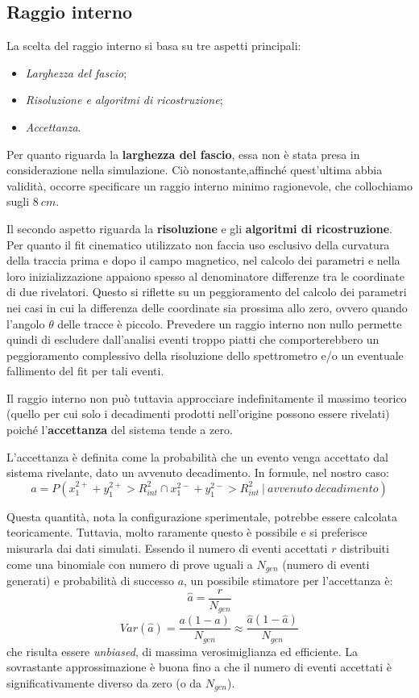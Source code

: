 \documentclass[8pt]{extarticle}
\begin{document}
\subsection{Raggio interno} \label{subsec:raggio_interno}
La scelta del raggio interno si basa su tre aspetti principali:
\begin{itemize}
\item \textit{Larghezza del fascio};
\item \textit{Risoluzione e algoritmi di ricostruzione};
\item \textit{Accettanza}.
\end{itemize}

Per quanto riguarda la \textbf{larghezza del fascio}, essa non è stata presa in considerazione nella simulazione. Ciò nonostante,affinché quest'ultima abbia validità, occorre specificare un raggio interno minimo ragionevole, che collochiamo sugli $8\ cm$. \medskip	

Il secondo aspetto riguarda la \textbf{risoluzione} e gli \textbf{algoritmi di ricostruzione}. Per quanto il fit cinematico utilizzato non faccia uso esclusivo della curvatura della traccia prima e dopo il campo magnetico, nel calcolo dei parametri e nella loro inizializzazione appaiono spesso al denominatore differenze tra le coordinate di due rivelatori. Questo si riflette su un peggioramento del calcolo dei parametri nei casi in cui la differenza delle coordinate sia prossima allo zero, ovvero quando l'angolo $\theta$ delle tracce è piccolo. Prevedere un raggio interno non nullo permette quindi di escludere dall'analisi eventi troppo piatti che comporterebbero un peggioramento complessivo della risoluzione dello spettrometro e/o un eventuale fallimento del fit per tali eventi. \medskip

Il raggio interno non può tuttavia approcciare indefinitamente il massimo teorico (quello per cui solo i decadimenti prodotti nell'origine possono essere rivelati) poiché l'\textbf{accettanza} del sistema tende a zero. \medskip

L'accettanza è definita come la probabilità che un evento venga accettato dal sistema rivelante, dato un avvenuto decadimento. In formule, nel nostro caso: \\
$$
a = P(x_1^{2+} + y_1^{2+} > R_{int}^2 \cap x_1^{2-} + y_1^{2-} > R_{int}^2\ |\ avvenuto\ decadimento)
$$

Questa quantità, nota la configurazione sperimentale, potrebbe essere calcolata teoricamente. Tuttavia, molto raramente questo è possibile e si preferisce misurarla dai dati simulati. Essendo il numero di eventi accettati $r$ distribuiti come una binomiale con numero di prove uguali a $N_{gen}$ (numero di eventi generati) e probabilità di successo $a$, un possibile stimatore per l'accettanza è: 
$$
\hat{a} = \frac{r}{N_{gen}}
$$
$$
Var(\hat{a}) = \frac{a(1-a)}{N_{gen}} \approx \frac{\hat{a}(1-\hat{a})}{N_{gen}}
$$
che risulta essere \textit{unbiased}, di massima verosimiglianza ed efficiente. La sovrastante approssimazione è buona fino a che il numero di eventi accettati è significativamente diverso da zero (o da $N_{gen}$). 
\end{document}
